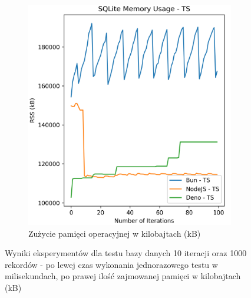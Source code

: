 \begin{figure}[H]
\begin{subfigure}[b]{0.4\textwidth}
    \centering
    \includegraphics[width=\textwidth]{Figures/database/sqlite_100_1000_ts_memory.png}
    \caption{Zużycie pamięci operacyjnej w kilobajtach (kB)}
    \label{fig:database_e2_ts_memory}
  \end{subfigure}
  \caption{Wyniki eksperymentów dla testu bazy danych 10 iteracji oraz 1000 rekordów - po lewej czas wykonania jednorazowego testu w milisekundach, po prawej ilość zajmowanej pamięci w kilobajtach (kB)}
  \label{fig:database_e2_ts}
\end{figure}